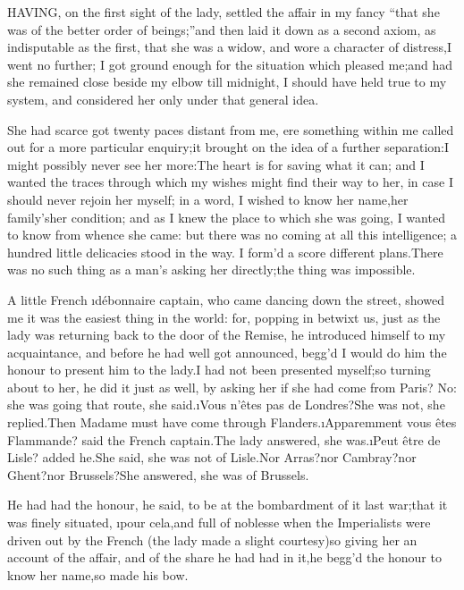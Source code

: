 \documentclass[twoside]{article}
\begin{document}


HAVING, on the first sight of the lady, settled the affair in my fancy
“that she was of the better order of beings;”\tsk and then laid it down as a
second axiom, as indisputable as the first, that she was a widow, and
wore a character of distress,\tsk I went no further; I got ground enough for
the situation which pleased me;\tsk and had she remained close beside my
elbow till midnight, I should have held true to my system, and considered
her only under that general idea.

She had scarce got twenty paces distant from me, ere something within me
called out for a more particular enquiry;\tsk it brought on the idea of a
further separation:\tsk I might possibly never see her more:\tsk The heart is for
saving what it can; and I wanted the traces through which my wishes might
find their way to her, in case I should never rejoin her myself; in a
word, I wished to know her name,\tsk her family’s\tsk her condition; and as I
knew the place to which she was going, I wanted to know from whence she
came: but there was no coming at all this intelligence; a hundred little
delicacies stood in the way.  I form’d a score different plans.\tsk There was
no such thing as a man’s asking her directly;\tsk the thing was impossible.

A little French \i{débonnaire} captain, who came dancing down the street,
showed me it was the easiest thing in the world: for, popping in betwixt
us, just as the lady was returning back to the door of the Remise, he
introduced himself to my acquaintance, and before he had well got
announced, begg’d I would do him the honour to present him to the lady.\tsk I
had not been presented myself;\tsk so turning about to her, he did it just as
well, by asking her if she had come from Paris?  No: she was going that
route, she said.\tsk \i{Vous n’êtes pas de Londres}?\tsk She was not, she
replied.\tsk Then Madame must have come through Flanders.\tsk \i{Apparemment vous
êtes Flammande}? said the French captain.\tsk The lady answered, she
was.\tsk \i{Peut être de Lisle}? added he.\tsk She said, she was not of Lisle.\tsk Nor
Arras?\tsk nor Cambray?\tsk nor Ghent?\tsk nor Brussels?\tsk She answered, she was of
Brussels.

He had had the honour, he said, to be at the bombardment of it last
war;\tsk that it was finely situated, \i{pour cela},\tsk and full of noblesse when
the Imperialists were driven out by the French (the lady made a slight
courtesy)\tsk so giving her an account of the affair, and of the share he had
had in it,\tsk he begg’d the honour to know her name,\tsk so made his bow.
\end{document}
